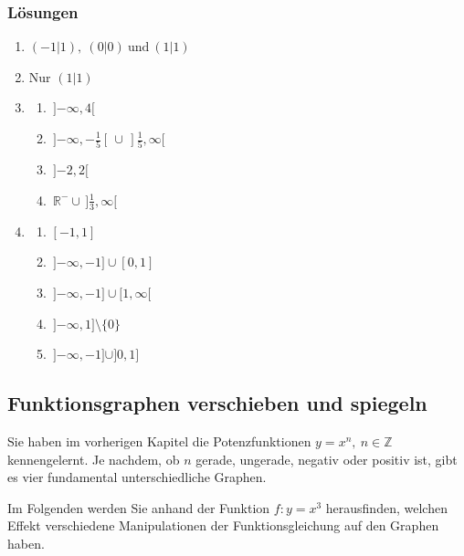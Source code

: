 \subsubsection{Lösungen}
\begin{enumerate}
    \item \( (-1|1),\ (0|0)\ \text{und}\ (1|1) \)
    \item Nur \( (1|1) \)
    \item
          \begin{enumerate}
              \item \( \, ]{-\infty}, 4[ \)
              \item \( \, ]{-\infty}, -\tfrac{1}{5}[ \, \cup \, ]\tfrac{1}{5}, \infty[ \)
              \item \( \, ]{-2}, 2[ \)
              \item \( \, \mathbb{R}^- \cup \, ]\tfrac{1}{3}, \infty[ \)
          \end{enumerate}
    \item
          \begin{enumerate}
              \item \( [-1,1] \)
              \item \( \, ]{-\infty}, -1] \cup [0,1] \)
              \item \( \, ]{-\infty}, -1] \cup [1, \infty[ \)
              \item \( \, ]{-\infty}, 1] \setminus \{0\} \)
              \item \( \, ]{-\infty}, -1] \cup ]0,1] \)
          \end{enumerate}
\end{enumerate}
\newpage
\subsection{Funktionsgraphen verschieben und spiegeln}
Sie haben im vorherigen Kapitel die Potenzfunktionen $y=x^n,\ n\in \mathbb{Z}$ kennengelernt. Je nachdem, ob $n$ gerade, ungerade, negativ oder positiv ist, gibt es vier fundamental unterschiedliche Graphen.

Im Folgenden werden Sie anhand der Funktion $f:y=x^3$ herausfinden, welchen Effekt verschiedene Manipulationen der Funktionsgleichung auf den Graphen haben.

